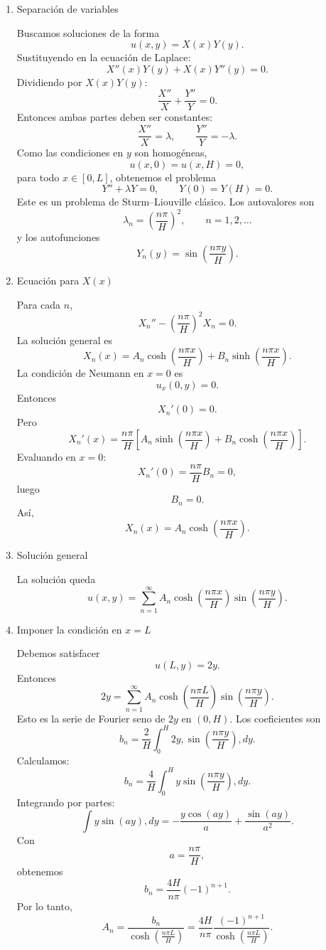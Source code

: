 \documentclass[11pt,spanish]{article}
\newcounter{problema}
\begin{document}
\begin{enumerate}
\item Separación de variables

Buscamos soluciones de la forma
$$
u(x,y)=X(x)Y(y).
$$
Sustituyendo en la ecuación de Laplace:
$$
X''(x)Y(y)+X(x)Y''(y)=0.
$$
Dividiendo por $X(x)Y(y)$:
$$
\frac{X''}{X}+\frac{Y''}{Y}=0.
$$
Entonces ambas partes deben ser constantes:
$$
\frac{X''}{X}=\lambda,
\qquad
\frac{Y''}{Y}=-\lambda.
$$
Como las condiciones en $y$ son homogéneas,
$$
u(x,0)=u(x,H)=0,
$$
para todo $x\in [0,L]$, 
obtenemos el problema
$$
Y''+\lambda Y=0,
\qquad
Y(0)=Y(H)=0.
$$
Este es un problema de Sturm–Liouville clásico.
Los autovalores son
$$
\lambda_n=\left(\frac{n\pi}{H}\right)^2,
\qquad n=1,2,\dots
$$
y los autofunciones
$$
Y_n(y)=\sin\left(\frac{n\pi y}{H}\right).
$$

\item Ecuación para $X(x)$

Para cada $n$,
$$
X_n''-\left(\frac{n\pi}{H}\right)^2 X_n=0.
$$
La solución general es
$$
X_n(x)=A_n\cosh\left(\frac{n\pi x}{H}\right)
+
B_n\sinh\left(\frac{n\pi x}{H}\right).
$$
La condición de Neumann en $x=0$ es
$$
u_x(0,y)=0.
$$
Entonces
$$
X_n'(0)=0.
$$
Pero
$$
X_n'(x)=
\frac{n\pi}{H}
\left[
A_n\sinh\left(\frac{n\pi x}{H}\right)
+
B_n\cosh\left(\frac{n\pi x}{H}\right)
\right].
$$
Evaluando en $x=0$:
$$
X_n'(0)=\frac{n\pi}{H}B_n=0,
$$
luego
$$
B_n=0.
$$
Así,
$$
X_n(x)=A_n\cosh\left(\frac{n\pi x}{H}\right).
$$

\item Solución general

La solución queda
$$
u(x,y)=
\sum_{n=1}^\infty
A_n
\cosh\left(\frac{n\pi x}{H}\right)
\sin\left(\frac{n\pi y}{H}\right).
$$

\item Imponer la condición en $x=L$

Debemos satisfacer
$$
u(L,y)=2y.
$$
Entonces
$$
2y=
\sum_{n=1}^\infty
A_n
\cosh\left(\frac{n\pi L}{H}\right)
\sin\left(\frac{n\pi y}{H}\right).
$$
Esto es la serie de Fourier seno de $2y$ en $(0,H)$.
Los coeficientes son
$$
b_n=
\frac{2}{H}
\int_0^H
2y,
\sin\left(\frac{n\pi y}{H}\right),dy.
$$
Calculamos:
$$
b_n=
\frac{4}{H}
\int_0^H
y\sin\left(\frac{n\pi y}{H}\right),dy.
$$
Integrando por partes:
$$
\int y\sin(ay),dy
=
-\frac{y\cos(ay)}{a}
+\frac{\sin(ay)}{a^2}.
$$
Con
$$
a=\frac{n\pi}{H},
$$
obtenemos
$$
b_n
=
\frac{4H}{n\pi}(-1)^{n+1}.
$$
Por lo tanto,
$$
A_n
=
\frac{b_n}{
\cosh\left(\frac{n\pi L}{H}\right)
}
=
\frac{4H}{n\pi}
\frac{(-1)^{n+1}}
{\cosh\left(\frac{n\pi L}{H}\right)}.
$$


\end{enumerate}
\end{document}
